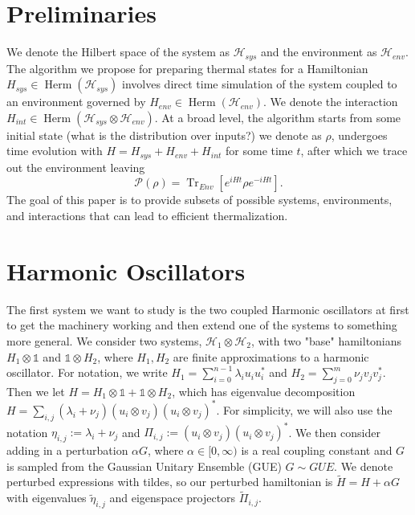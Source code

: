 \documentclass{article}
\newcommand{\parens}[1]{\left( #1 \right)}
\newcommand{\brackets}[1]{\left[ #1 \right]}
\newcommand{\openone}{\mathds{1}}
\DeclareMathOperator{\Tr}{Tr}
\newcommand{\partrace}[2]{\Tr_{#1} \brackets{ #2 }}
\newcommand{\hilb}{\mathscr{H}}
\DeclareMathOperator{\hermMathOp}{Herm}
\newcommand{\herm}[1]{\hermMathOp\parens{#1}}
\begin{document}
\section{Preliminaries}
We denote the Hilbert space of the system as $\hilb_{sys}$ and the environment as $\hilb_{env}$. The algorithm we propose for preparing thermal states for a Hamiltonian $H_{sys} \in \herm{\hilb_{sys}}$ involves direct time simulation of the system coupled to an environment governed by $H_{env} \in \herm{\hilb_{env}}$. We denote the interaction $H_{int} \in \herm{\hilb_{sys} \otimes \hilb_{env}}$. At a broad level, the algorithm starts from some initial state (what is the distribution over inputs?) we denote as $\rho$, undergoes time evolution with $H = H_{sys} + H_{env} + H_{int}$ for some time $t$, after which we trace out the environment leaving
\begin{equation}
    \mathcal{P}(\rho) = \partrace{Env}{e^{i H t} \rho e^{-i H t}}.
\end{equation}
The goal of this paper is to provide subsets of possible systems, environments, and interactions that can lead to efficient thermalization. 

\section{Harmonic Oscillators}
The first system we want to study is the two coupled Harmonic oscillators at first to get the machinery working and then extend one of the systems to something more general. We consider two systems, $\hilb_1 \otimes \hilb_2$, with two "base" hamiltonians $H_1 \otimes \openone$ and $\openone \otimes H_2$, where $H_1, H_2$ are finite approximations to a harmonic oscillator. For notation, we write $H_1 = \sum_{i = 0}^{n-1} \lambda_i u_i u_i^*$ and $H_2 = \sum_{j = 0}^{m} \nu_j v_j v_j^*$. Then we let $H = H_1 \otimes \openone + \openone \otimes H_2$, which has eigenvalue decomposition $H = \sum_{i,j} (\lambda_i + \nu_j) (u_i \otimes v_j)(u_i \otimes v_j)^*$. For simplicity, we will also use the notation $\eta_{i,j} := \lambda_i + \nu_j$ and $\Pi_{i,j} := (u_i \otimes v_j) (u_i \otimes v_j)^*$. We then consider adding in a perturbation $\alpha G$, where $\alpha \in [0, \infty)$ is a real coupling constant and $G$ is sampled from the Gaussian Unitary Ensemble (GUE) $G \sim GUE$. We denote perturbed expressions with tildes, so our perturbed hamiltonian is $\widetilde{H} = H + \alpha G$ with eigenvalues $\widetilde{\eta}_{i,j}$ and eigenspace projectors $\widetilde{\Pi}_{i,j}$. 
\end{document}

